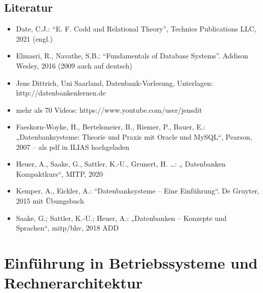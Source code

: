 \hypertarget{literaturpathlabelmi-2017modulbeschreibungen-bachelorba_datenbanken1}{%
\section*{Literatur\label{/mi-2017/modulbeschreibungen-bachelor/BA_Datenbanken1}}\label{literaturpathlabelmi-2017modulbeschreibungen-bachelorba_datenbanken1}}

\begin{itemize}
\tightlist
\item
  Date, C.J.: ``E. F. Codd and Relational Theory'', Technics
  Publications LLC, 2021 (engl.)
\item
  Elmasri, R., Navathe, S.B.: ``Fundamentals of Database Systems''.
  Addison Wesley, 2016 (2009 auch auf deutsch)
\item
  Jens Dittrich, Uni Saarland, Datenbank-Vorlesung, Unterlagen:
  http://datenbankenlernen.de
\item
  mehr als 70 Videos: https://www.youtube.com/user/jensdit
\item
  Faeskorn-Woyke, H., Bertelsmeier, B., Riemer, P., Bauer, E.:
  „Datenbanksysteme: Theorie und Praxis mit Oracle und MySQL``, Pearson,
  2007 -- als pdf in ILIAS hochgeladen
\item
  Heuer, A., Saake, G., Sattler, K.-U., Grunert, H. \ldots: „
  Datenbanken Kompaktkurs``, MITP, 2020
\item
  Kemper, A., Eickler, A.: ``Datenbanksysteme -- Eine Einführung``. De
  Gruyter, 2015 mit Übungsbuch
\item
  Saake, G.; Sattler, K.-U.; Heuer, A.: „Datenbanken -- Konzepte und
  Sprachen``, mitp/bhv, 2018 ADD
\end{itemize}

\hypertarget{einfuxfchrung-in-betriebssysteme-und-rechnerarchitekturpathlabelmi-2017modulbeschreibungen-bachelorba_einfhrunginbetriebssystemeundrechnerarchitektur}{%
\chapter{Einführung in Betriebssysteme und
Rechnerarchitektur\label{/mi-2017/modulbeschreibungen-bachelor/BA_EinfhrunginBetriebssystemeundRechnerarchitektur}}\label{einfuxfchrung-in-betriebssysteme-und-rechnerarchitekturpathlabelmi-2017modulbeschreibungen-bachelorba_einfhrunginbetriebssystemeundrechnerarchitektur}}

